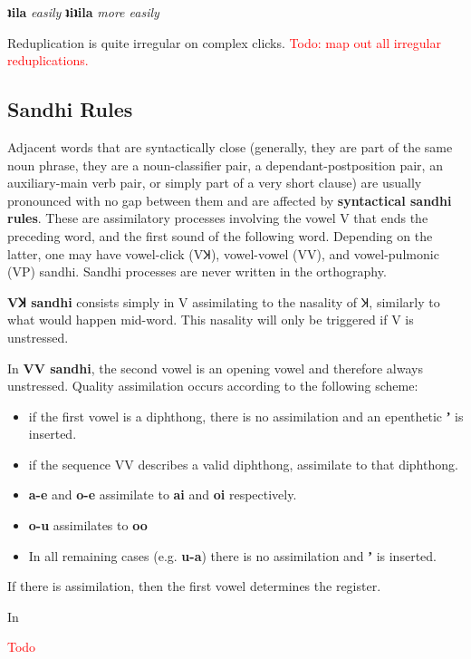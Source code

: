 \documentclass[11pt]{book}
\newcommand{\qcn}[1]{\textbf{#1}}
\newcommand{\transl}[2]{\qcn{#1} \emph{#2}}
\newcommand{\cmnt}[1]{\textcolor{red}{#1}}
\begin{document}
\begin{center}
\transl{ʇila}{easily} \textrightarrow \transl{ʇiʇila}{more easily}
\end{center}

Reduplication is quite irregular on complex clicks. \cmnt{Todo: map out all irregular reduplications.}

\subsection{Sandhi Rules}

Adjacent words that are syntactically close (generally, they are part of the same noun phrase, they are a noun-classifier pair, a dependant-postposition pair, an auxiliary-main verb pair, or simply part of a very short clause) are usually pronounced with no gap between them and are affected by \textbf{syntactical sandhi rules}.  These are assimilatory processes involving the vowel V that ends the preceding word, and the first sound of the following word. Depending on the latter, one may have vowel-click (VꞰ), vowel-vowel (VV), and vowel-pulmonic (VP) sandhi. Sandhi processes are never written in the orthography.

\textbf{VꞰ sandhi} consists simply in V assimilating to the nasality of Ʞ, similarly to what would happen mid-word. This nasality will only be triggered if V is unstressed.

In \textbf{VV sandhi}, the second vowel is an opening vowel and therefore always unstressed. Quality assimilation occurs according to the following scheme:

\begin{itemize}
\item if the first vowel is a diphthong, there is no assimilation and an epenthetic \qcn{ʼ} is inserted.
\item if the sequence VV describes a valid diphthong, assimilate to that diphthong.
\item \qcn{a-e} and \qcn{o-e} assimilate to \qcn{ai} and \qcn{oi} respectively.
\item \qcn{o-u} assimilates to \qcn{oo}
\item In all remaining cases (e.g. \qcn{u-a}) there is no assimilation and \qcn{ʼ} is inserted.
\end{itemize}

If there is assimilation, then the first vowel determines the register.

In 

\cmnt{Todo}
\end{document}
